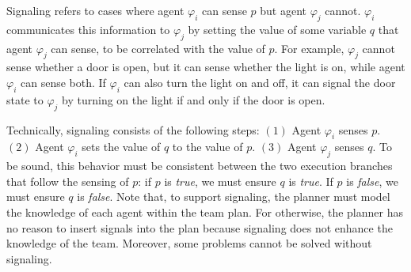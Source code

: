\documentclass[letterpaper]{article} %
\theoremstyle{definition}
\begin{document}
Signaling refers to cases where agent $\varphi_i$ can sense $p$ but agent $\varphi_j$ cannot.
$\varphi_i$  communicates this information to $\varphi_j$ by setting the value of some variable $q$ that agent $\varphi_j$ can sense, to be correlated with the value of $p$. For example,  $\varphi_j$ cannot sense whether a door is open, but it can sense whether the light is on, while agent $\varphi_i$ can sense both. If $\varphi_i$ can also turn the light on and off, it can signal the door state to $\varphi_j$ by turning on the light if and only if the door is open.



Technically, signaling consists of the following steps: $(1)$ Agent $\varphi_i$ senses $p$. $(2)$ Agent $\varphi_i$ sets the value of $q$ to the value of $p$. $(3)$ Agent $\varphi_j$ senses $q$.
To be sound, this behavior must be consistent between the two execution branches that follow the sensing of $p$: if $p$ is \emph{true}, we must ensure $q$ is \emph{true}.
If $p$ is \emph{false}, we must ensure $q$ is \emph{false}.
%
Note that, to support signaling, the planner must model the knowledge of each agent within the team plan. For otherwise, the planner has no reason to insert signals into the plan because signaling does not enhance the knowledge of the team. Moreover, some problems cannot be solved without signaling.




\end{document}
